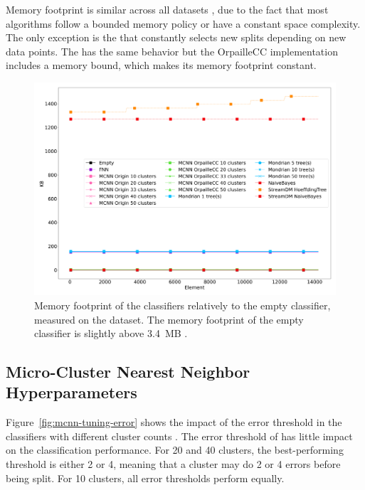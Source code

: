 Memory footprint is similar across all datasets , due to the fact that most
algorithms follow a bounded memory policy or have a constant space complexity.
The only exception is the \hoeffdingtree that constantly selects new splits
depending on new data points. The \mondrianforest has the same behavior but the
OrpailleCC implementation includes a memory bound, which makes its memory
footprint constant.

\begin{figure}
	\includegraphics[width=\linewidth]{figures/results/banos_3_memory.png}
	\caption{Memory footprint of the classifiers relatively to the empty
	classifier, measured on the \banosdataset dataset. The memory footprint of the empty
	classifier is slightly above 3.4~MB .}
	\label{fig:memory}
\end{figure}


\subsection{Micro-Cluster Nearest Neighbor Hyperparameters}

Figure~\ref{fig:mcnn-tuning-error} shows the impact of the error threshold
in the \mcnn classifiers with different cluster counts . The error
threshold of \mcnn has little impact on the classification performance. For
20 and 40 clusters, the best-performing threshold is either 2 or 4, meaning
that a cluster may do 2 or 4 errors before being split. For 10 clusters,
all error thresholds perform equally.

